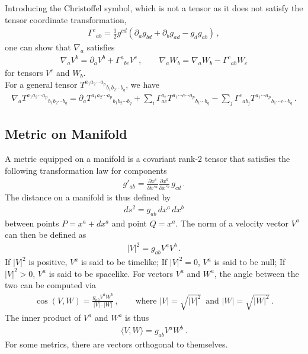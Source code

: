 \documentclass[11pt, onesided]{book}
\theoremstyle{break}
\theoremstyle{break}
\newcommand{\pd}{\partial}
\begin{document}
Introducing the Christoffel symbol, which is not a tensor as it does not satisfy the tensor coordinate transformation, 
\begin{align*}
\Gamma^c{}_{ab} = \frac{1}{2}g^{cd}\left( \pd_a g_{bd} + \pd_b g_{ad} - g_d g_{ab}\right)\,,
\end{align*}
one can show that $\nabla_a$ satisfies
\begin{align*}
\nabla_a V^b = \pd_a V^b + \Gamma^a{}_{bc} V^c\,,\qquad 
\nabla_a W_b = \nabla_a W_b - \Gamma^c{}_{ab} W_c
\end{align*}
for tensors $V^c$ and $W_b$.\\

For a general tensor $T^{a_1a_2\cdots a_p}{}_{b_1b_2\cdots b_q}$, we have
\begin{align*}
\nabla_a T^{a_1a_2\cdots a_p}{}_{b_1b_2\cdots b_q} = \pd_a T^{a_1a_2\cdots a_p}{}_{b_1b_2\cdots b_q} + \sum_i \Gamma^{a_i}_{ac}T^{a_1\cdots c \cdots a_p}{}_{b_1\cdots b_q} - \sum_j\Gamma^c{}_{ab_j}T^{a_1\cdots a_p}{}_{b_1 \cdots c \cdots b_q} \,.
\end{align*}

\subsection{Metric on Manifold}
A metric equipped on a manifold is a covariant rank-$2$ tensor that satisfies the following transformation law for components
\begin{align*}
g'_{ab} = \frac{\pd x^c}{\pd x'{}^a}\frac{\pd x^d}{\pd x'{}^b}\, g_{cd}\,.
\end{align*}
The distance on a manifold is thus defined by
\begin{align*}
ds^2 = g_{ab} \, dx^a \, dx^b
\end{align*}
between points $P = x^a + dx^a$ and point $Q = x^a$. The norm of a velocity vector $V^a$ can then be defined as
\begin{align*}
|V|^2 = g_{ab}V^aV^b\,.
\end{align*}
If $|V|^2$ is positive, $V^a$ is said to be timelike; If $|V|^2 = 0$, $V^a$ is said to be null; If $|V|^2 >0$, $V^a$ is said to be spacelike. For vectors $V^a$ and $W^a$, the angle between the two can be computed via
\begin{align*}
\cos(V,W) = \frac{g_{ab}V^aW^b}{|V| \cdot |W|}\,,\qquad \text{where }|V| = \sqrt{|V|^2}\, \text{ and }|W| = \sqrt{|W|^2}\,. 
\end{align*}
The inner product of $V^a$ and $W^a $ is thus
\begin{align*}
\langle V, W\rangle = g_{ab} V^aW^b\,.
\end{align*}
For some metrics, there are vectors orthogonal to themselves.\\
\end{document}
